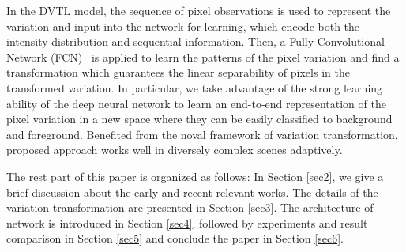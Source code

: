 \documentclass[journal]{IEEEtran}
\newcommand{\refsec}[1]{Section \ref{#1}}
\begin{document}
In the DVTL model, 
the sequence of pixel observations is used to represent the variation and input into the network for learning,
which encode both the intensity distribution and sequential information.
%
Then, a Fully Convolutional Network (FCN)\ \cite{Shelhamer2017fcn} is applied to learn the patterns of the pixel variation and find a transformation which guarantees the linear separability of pixels in the transformed variation.
%
In particular,
we take advantage of the strong learning ability of the deep neural network to learn an end-to-end representation of the pixel variation in a new space where they can be easily classified to background and foreground.
%
Benefited from the noval framework of variation transformation,
proposed approach works well in diversely complex scenes adaptively.
%
% 
% 
% 
% 

The rest part of this paper is organized as follows: In \refsec{sec2}, we give a brief discussion about the early and recent relevant works. 
%
The details of the variation transformation are presented in \refsec{sec3}. The architecture of network is introduced in \refsec{sec4}, followed by experiments and result comparison in \refsec{sec5} and conclude the paper in \refsec{sec6}. 
\end{document}
